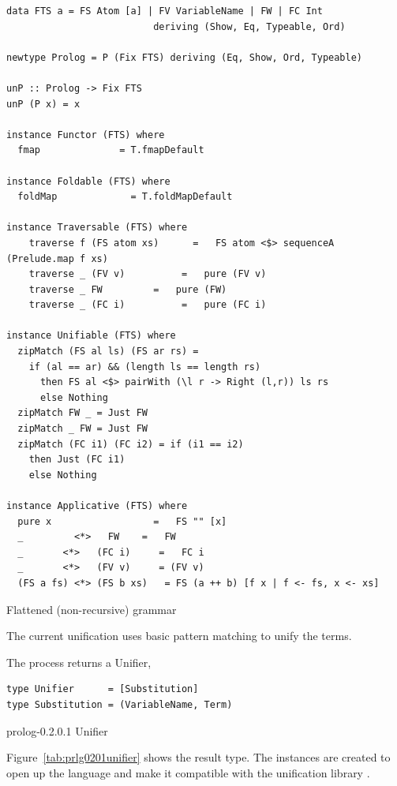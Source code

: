 \documentclass[thesis-solanki.tex]{subfiles}
\begin{document}
\begin{code-list}[h]
\begin{verbatim}
data FTS a = FS Atom [a] | FV VariableName | FW | FC Int
                          deriving (Show, Eq, Typeable, Ord)

newtype Prolog = P (Fix FTS) deriving (Eq, Show, Ord, Typeable)

unP :: Prolog -> Fix FTS
unP (P x) = x

instance Functor (FTS) where
  fmap              = T.fmapDefault

instance Foldable (FTS) where
  foldMap             = T.foldMapDefault

instance Traversable (FTS) where
    traverse f (FS atom xs)      =   FS atom <$> sequenceA (Prelude.map f xs)
    traverse _ (FV v)          =   pure (FV v)
    traverse _ FW         =   pure (FW)
    traverse _ (FC i)          =   pure (FC i)

instance Unifiable (FTS) where
  zipMatch (FS al ls) (FS ar rs) = 
    if (al == ar) && (length ls == length rs) 
      then FS al <$> pairWith (\l r -> Right (l,r)) ls rs     
      else Nothing
  zipMatch FW _ = Just FW
  zipMatch _ FW = Just FW
  zipMatch (FC i1) (FC i2) = if (i1 == i2) 
    then Just (FC i1) 
    else Nothing

instance Applicative (FTS) where
  pure x                  =   FS "" [x] 
  _         <*>   FW    =   FW
  _       <*>   (FC i)     =   FC i
  _       <*>   (FV v)     = (FV v)
  (FS a fs) <*> (FS b xs)   = FS (a ++ b) [f x | f <- fs, x <- xs]

\end{verbatim}
\caption{Flattened (non-recursive) grammar}
\label{tab:flatgrp0201}
\end{code-list}

\clearpage

The current unification uses basic pattern matching to unify the terms. 

The process returns a Unifier,
\begin{code-list}[h]
\begin{verbatim}
type Unifier      = [Substitution]
type Substitution = (VariableName, Term)
\end{verbatim}
\caption{prolog-0.2.0.1 Unifier}
\label{tab:prlg0201unifier}
\end{code-list}
Figure~\ref{tab:prlg0201unifier} shows the result type. The instances are created to open up the language and make it compatible with the
unification library \cite{prolog-lib}.
\end{document}
